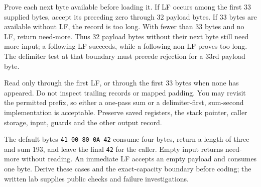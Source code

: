 Prove each next byte available before loading it. If LF occurs among the first
33 supplied bytes, accept its preceding zero through 32 payload bytes. If 33
bytes are available without LF, the record is too long. With fewer than 33 bytes
and no LF, return need-more. Thus 32 payload bytes without their next byte still
need more input; a following LF succeeds, while a following non-LF proves too-long.
The delimiter test at that boundary must precede rejection for a 33rd payload byte.

Read only through the first LF, or through the first 33 bytes when none has appeared.
Do not inspect trailing records or mapped padding. You may revisit the permitted
prefix, so either a one-pass sum or a delimiter-first, sum-second implementation
is acceptable. Preserve saved registers, the stack pointer, caller storage, input,
guards and the other output record.

The default bytes \texttt{41 00 80 0A 42} consume four bytes, return a length of
three and sum 193, and leave the final \texttt{42} for the caller. Empty input
returns need-more without reading. An immediate LF accepts an empty payload and
consumes one byte. Derive these cases and the exact-capacity boundary before
coding; the written lab supplies public checks and failure investigations.
